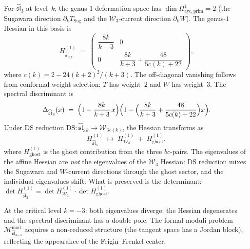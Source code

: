 \begin{computation}
\label{comp:sl3-genus1-hessian}
For $\widehat{\mathfrak{sl}}_3$ at level~$k$, the genus-$1$
deformation space has $\dim H^1_{\mathrm{cyc,prim}}=2$
(the Sugawara direction $\partial_k T_{\mathrm{Sug}}$ and the
$\mathcal W_3$-current direction $\partial_k W$).
The genus-$1$ Hessian in this basis is
\[
H^{(1)}_{\widehat{\mathfrak{sl}}_3{}_k}
\;=\;
\begin{pmatrix}
\dfrac{8k}{k+3} & 0 \\[6pt]
0 & \dfrac{8k}{k+3}+\dfrac{48}{5c(k)+22}
\end{pmatrix},
\]
where $c(k)=2-24(k{+}2)^2/(k{+}3)$.
The off-diagonal vanishing
follows from conformal weight selection: $T$ has weight~$2$
and $W$ has weight~$3$. The spectral discriminant is
\[
\Delta_{\widehat{\mathfrak{sl}}_3}(x)
\;=\;
\Bigl(1-\frac{8k}{k+3}\,x\Bigr)
\Bigl(1-\Bigl(\frac{8k}{k+3}+\frac{48}{5c(k)+22}\Bigr)x\Bigr).
\]
Under DS reduction
$\mathrm{DS}\colon\widehat{\mathfrak{sl}}_3{}_k
\to\mathcal W_3{}_{c(k)}$, the Hessian transforms as
\[
H^{(1)}_{\widehat{\mathfrak{sl}}_3}
\;\longmapsto\;
H^{(1)}_{\mathcal W_3}
\;+\;
H^{(1)}_{\mathrm{ghost}},
\]
where $H^{(1)}_{\mathrm{ghost}}$ is the ghost contribution
from the three $bc$-pairs. The eigenvalues of the
affine Hessian are \emph{not} the eigenvalues of the
$\mathcal W_3$ Hessian: DS reduction mixes the Sugawara and
$W$-current directions through the ghost sector, and the
individual eigenvalues shift. What is preserved is the
determinant:
$\det H^{(1)}_{\widehat{\mathfrak{sl}}_3}
=\det H^{(1)}_{\mathcal W_3}\cdot\det H^{(1)}_{\mathrm{ghost}}$.

At the critical level $k=-3$: both eigenvalues diverge;
the Hessian degenerates and the spectral discriminant has
a double pole. The formal moduli problem
$\mathcal M^{\mathrm{mod}}_{\widehat{\mathfrak{sl}}_3{}_{-3}}$
acquires a non-reduced structure (the tangent space has a
Jordan block), reflecting the appearance of the
Feigin--Frenkel center.
\end{computation}

